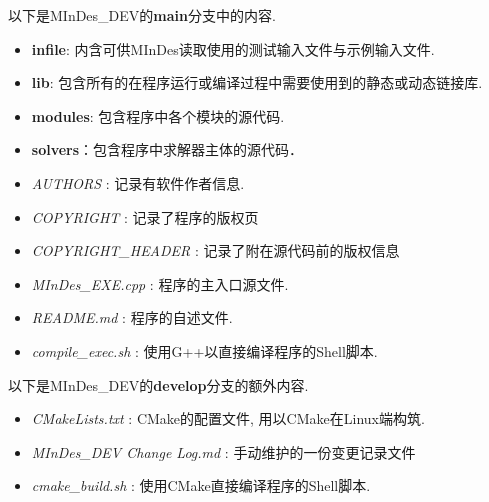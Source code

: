 以下是MInDes\_DEV的\textbf{main}分支中的内容.
\begin{itemize}
      \item \textbf{infile}: 内含可供MInDes读取使用的测试输入文件与示例输入文件.
      \item \textbf{lib}: 包含所有的在程序运行或编译过程中需要使用到的静态或动态链接库.
      \item \textbf{modules}: 包含程序中各个模块的源代码.
      \item \textbf{solvers}：包含程序中求解器主体的源代码．
      \item \emph{AUTHORS          } : 记录有软件作者信息.
      \item \emph{COPYRIGHT        } : 记录了程序的版权页
      \item \emph{COPYRIGHT\_HEADER} : 记录了附在源代码前的版权信息
      \item \emph{MInDes\_EXE.cpp  } : 程序的主入口源文件.
      \item \emph{README.md        } : 程序的自述文件.
      \item \emph{compile\_exec.sh } : 使用G++以直接编译程序的Shell脚本.
\end{itemize}
以下是MInDes\_DEV的\textbf{develop}分支的额外内容.
\begin{itemize}
      \item \emph{CMakeLists.txt           }     : CMake的配置文件, 用以CMake在Linux端构筑.
      \item \emph{MInDes\_DEV Change Log.md}     : 手动维护的一份变更记录文件
      \item \emph{cmake\_build.sh          }     : 使用CMake直接编译程序的Shell脚本.
\end{itemize}
\endinput